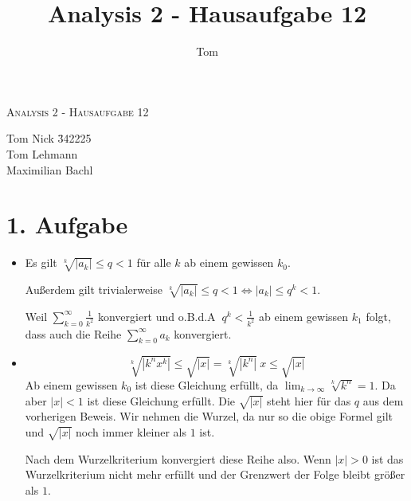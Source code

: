 \documentclass[10pt,a4paper,parskip=half]{scrartcl}
\author{Tom}
\title{Analysis 2 - Hausaufgabe 12}
\begin{document}
\begin{center}
\textsc{\Large{Analysis 2 - Hausaufgabe 12}} \\
\end{center}
\begin{tabbing}
Tom Nick \hspace{1.4cm}\= 342225\\
Tom Lehmann\\
Maximilian Bachl
\end{tabbing}
\section*{1. Aufgabe}
\begin{itemize}
\item
Es gilt $\sqrt[k]{\left|a_k\right|} \le q < 1$ für alle $k$ ab einem gewissen $k_0$. 

Außerdem gilt trivialerweise $\sqrt[k]{\left|a_k\right|} \le q <1 \Leftrightarrow \left|a_k\right| \le q^k <1$. 

Weil $\sum_{k=0}^{\infty} \frac 1 {k^2}$ konvergiert und o.B.d.A $~q^k < \frac 1 {k^2}$ ab einem gewissen $k_1$ folgt, dass auch die Reihe $\sum_{k=0}^{\infty} a_k$ konvergiert.
\item
$$\sqrt[k]{|k^nx^k|} \le \sqrt {|x|} = \sqrt[k]{|k^n|}~x \le \sqrt {|x|}$$
Ab einem gewissen $k_0$ ist diese Gleichung erfüllt, da $\lim_{k\to\infty} \sqrt[k]{k^n} = 1$. Da aber $|x| < 1$ ist diese Gleichung erfüllt. Die $ \sqrt {|x|}$ steht hier für das $q$ aus dem vorherigen Beweis. Wir nehmen die Wurzel, da nur so die obige Formel gilt und $\sqrt {|x|}$ noch immer kleiner als $1$ ist. 

Nach dem Wurzelkriterium konvergiert diese Reihe also. Wenn $\left| x \right| > 0$ ist das Wurzelkriterium nicht mehr erfüllt und der Grenzwert der Folge bleibt größer als $1$. 
\end{itemize}
\end{document}
